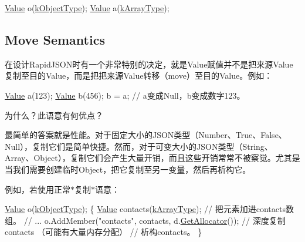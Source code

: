 \begin{DoxyCode}
\hyperlink{class_generic_value}{Value} o(\hyperlink{rapidjson_8h_a1d1cfd8ffb84e947f82999c682b666a7a146f46700e905e8df96a6a90b5c7640f}{kObjectType});
\hyperlink{class_generic_value}{Value} a(\hyperlink{rapidjson_8h_a1d1cfd8ffb84e947f82999c682b666a7af41527d6925efa3c5c3dadb23dfef7c8}{kArrayType});
\end{DoxyCode}
\hypertarget{md_Commun_Externe_RapidJSON_doc_tutorial.zh-cn_MoveSemantics}{}\subsection{Move Semantics}\label{md_Commun_Externe_RapidJSON_doc_tutorial.zh-cn_MoveSemantics}
在设计\+Rapid\+J\+S\+O\+N时有一个非常特别的决定，就是\+Value赋值并不是把来源\+Value复制至目的\+Value，而是把把来源\+Value转移（move）至目的\+Value。例如：


\begin{DoxyCode}
\hyperlink{class_generic_value}{Value} a(123);
\hyperlink{class_generic_value}{Value} b(456);
b = a;         \textcolor{comment}{// a变成Null，b变成数字123。}
\end{DoxyCode}




为什么？此语意有何优点？

最简单的答案就是性能。对于固定大小的\+J\+S\+O\+N类型（\+Number、\+True、\+False、\+Null），复制它们是简单快捷。然而，对于可变大小的\+J\+S\+O\+N类型（\+String、\+Array、\+Object），复制它们会产生大量开销，而且这些开销常常不被察觉。尤其是当我们需要创建临时\+Object，把它复制至另一变量，然后再析构它。

例如，若使用正常$\ast$复制$\ast$语意：


\begin{DoxyCode}
\hyperlink{class_generic_value}{Value} o(\hyperlink{rapidjson_8h_a1d1cfd8ffb84e947f82999c682b666a7a146f46700e905e8df96a6a90b5c7640f}{kObjectType});
\{
    \hyperlink{class_generic_value}{Value} contacts(\hyperlink{rapidjson_8h_a1d1cfd8ffb84e947f82999c682b666a7af41527d6925efa3c5c3dadb23dfef7c8}{kArrayType});
    \textcolor{comment}{// 把元素加进contacts数组。}
    \textcolor{comment}{// ...}
    o.AddMember(\textcolor{stringliteral}{"contacts"}, contacts, d.\hyperlink{class_generic_document_aa4609d6b19f86aec1a6b96edf2c27686}{GetAllocator}());  \textcolor{comment}{// 深度复制contacts （可能有大量内存分配）}
    \textcolor{comment}{// 析构contacts。}
\}
\end{DoxyCode}




